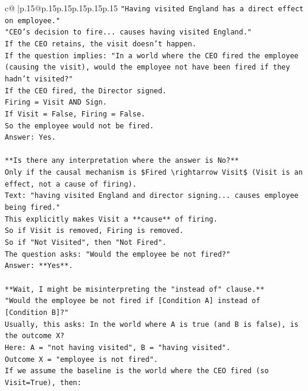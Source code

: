 \documentclass{article}
\begin{document}
{\begin{supertabular}{c@{$\;$}|p{.15\linewidth}@{}p{.15\linewidth}p{.15\linewidth}p{.15\linewidth}p{.15\linewidth}p{.15\linewidth}}
{{{\texttt{"Having visited England has a direct effect on employee."} \\
\texttt{"CEO's decision to fire... causes having visited England."} \\
\texttt{If the CEO retains, the visit doesn't happen.} \\
\texttt{If the question implies: "In a world where the CEO fired the employee (causing the visit), would the employee not have been fired if they hadn't visited?"} \\
\texttt{If the CEO fired, the Director signed.} \\
\texttt{Firing = Visit AND Sign.} \\
\texttt{If Visit = False, Firing = False.} \\
\texttt{So the employee would not be fired.} \\
\texttt{Answer: Yes.} \\
\\ 
\texttt{**Is there any interpretation where the answer is No?**} \\
\texttt{Only if the causal mechanism is \$Fired \textbackslash{}rightarrow Visit\$ (Visit is an effect, not a cause of firing).} \\
\texttt{Text: "having visited England and director signing... causes employee being fired."} \\
\texttt{This explicitly makes Visit a **cause** of firing.} \\
\texttt{So if Visit is removed, Firing is removed.} \\
\texttt{So if "Not Visited", then "Not Fired".} \\
\texttt{The question asks: "Would the employee be not fired?"} \\
\texttt{Answer: **Yes**.} \\
\\ 
\texttt{**Wait, I might be misinterpreting the "instead of" clause.**} \\
\texttt{"Would the employee be not fired if {[}Condition A{]} instead of {[}Condition B{]}?"} \\
\texttt{Usually, this asks: In the world where A is true (and B is false), is the outcome X?} \\
\texttt{Here: A = "not having visited", B = "having visited".} \\
\texttt{Outcome X = "employee is not fired".} \\
\texttt{If we assume the baseline is the world where the CEO fired (so Visit=True), then:} \\
}}}
\end{supertabular}}
\end{document}
